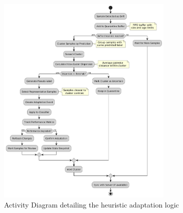 \begin{figure}[htbp]
    \centering
    \includegraphics[width=0.75\textwidth]{figs/framework/heuristic-adaptation-activity.png}
    \caption[Activity Diagram of the Heuristic Adaptation Process]{Activity Diagram detailing the heuristic adaptation logic}
    \label{fig:heuristic_adaptation_sequence_diagram}
\end{figure}
\FloatBarrier

